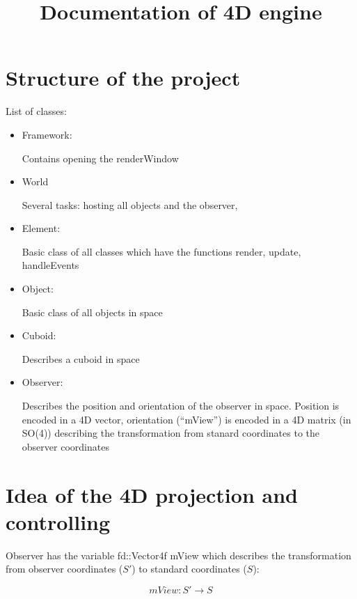 \documentclass[titlepage]{scrartcl}
\begin{document}
\title{Documentation of 4D engine}

\maketitle

\section{Structure of the project}

List of classes: 

\begin{itemize}
\item Framework: 

Contains opening the renderWindow

\item World

Several tasks: hosting all objects and the observer, 

\item Element:

Basic class of all classes which have the functions render, update, handleEvents

\item Object:

Basic class of all objects in space

\item Cuboid:

Describes a cuboid in space

\item Observer:

Describes the position and orientation of the observer in space. Position is encoded in a 4D vector, orientation (\enquote{mView}) is encoded in a 4D matrix (in SO(4)) describing the transformation from stanard coordinates to the observer coordinates 

\end{itemize}

\section{Idea of the 4D projection and controlling}

Observer has the variable fd::Vector4f mView which describes the transformation from observer coordinates ($S'$) to standard coordinates ($S$):

\begin{equation}
mView: S' \to S
\end{equation}
\end{document}
